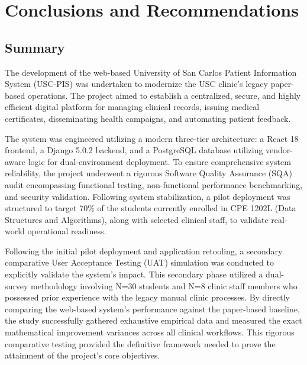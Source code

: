 
\chapter{Conclusions and Recommendations}

\ifpdf
    \graphicspath{{Chapter5/Figs/Raster/}{Chapter5/PDF/}{Chapter5/Figs/}}
\else
    \graphicspath{{Chapter5/Figs/Vector/}{Chapter5/Figs/}}
\fi

\section{Summary}

The development of the web-based University of San Carlos Patient Information System (USC-PIS) was undertaken to modernize the USC clinic's legacy paper-based operations. The project aimed to establish a centralized, secure, and highly efficient digital platform for managing clinical records, issuing medical certificates, disseminating health campaigns, and automating patient feedback.

The system was engineered utilizing a modern three-tier architecture: a React 18 frontend, a Django 5.0.2 backend, and a PostgreSQL database utilizing vendor-aware logic for dual-environment deployment. To ensure comprehensive system reliability, the project underwent a rigorous Software Quality Assurance (SQA) audit encompassing functional testing, non-functional performance benchmarking, and security validation. Following system stabilization, a pilot deployment was structured to target 70\% of the students currently enrolled in CPE 1202L (Data Structures and Algorithms), along with selected clinical staff, to validate real-world operational readiness.

Following the initial pilot deployment and application retooling, a secondary comparative User Acceptance Testing (UAT) simulation was conducted to explicitly validate the system's impact. This secondary phase utilized a dual-survey methodology involving N=30 students and N=8 clinic staff members who possessed prior experience with the legacy manual clinic processes. By directly comparing the web-based system's performance against the paper-based baseline, the study successfully gathered exhaustive empirical data and measured the exact mathematical improvement variances across all clinical workflows. This rigorous comparative testing provided the definitive framework needed to prove the attainment of the project's core objectives.

